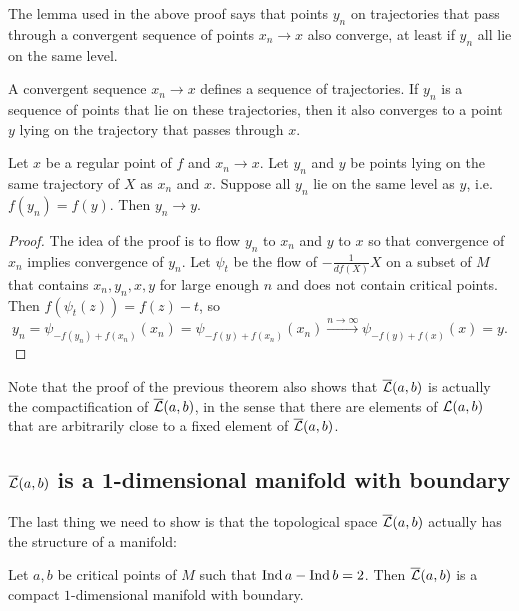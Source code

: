 The lemma used in the above proof says that points $y_n$ on trajectories that pass through a convergent sequence of points $x_n \to x$ also converge, at least if $y_n$ all lie on the same level.
\begin{marginfigure}
    \centering
    \caption{A convergent sequence $x_n \to  x$ defines a sequence of trajectories. If $y_n$ is a sequence of points that lie on these trajectories, then it also converges to a point $y$ lying on the trajectory that passes through $x$.}
    \label{fig:lemma-partial-squared-zero-proof}
\end{marginfigure}
\begin{lemma}
    Let $x$ be a regular point of $f$ and $x_n \to x$.
    Let $y_n$ and  $y$ be points lying on the same trajectory of $X$ as  $x_n$ and  $x$.
    Suppose all $y_n$ lie on the same level as  $y$, i.e.  $f(y_n) = f(y)$.
    Then  $y_n \to  y$.
    \label{lemma:level-sets}
\end{lemma}
\begin{proof}
    The idea of the proof is to flow $y_n$ to  $x_n$ and $y$ to $x$ so that convergence of $x_n$ implies convergence of $y_n$.
    Let  $\psi_t$ be the flow of  $-\frac{1}{df (X)} X$ on a subset of $M$ that contains $x_n, y_n, x, y$ for large enough  $n$ and does not contain critical points.
    Then $f(\psi_t(z)) = f(z) - t$, so
     \[
         y_n = \psi_{-f(y_n) + f(x_n)}(x_n) = \psi_{-f(y) + f(x_n)}(x_n) \xrightarrow{n \to \infty}   \psi_{-f(y) + f(x)}(x) = y
    .\] 
\end{proof}

Note that the proof of the previous theorem also shows that $\overline{\mathcal L}(a, b) $ is actually the compactification of  $\overline{\mathcal L}(a, b)$, in the sense that there are elements of  $\mathcal L(a, b)$ that are arbitrarily close to a fixed element of $\overline{\mathcal L}(a, b)$.

\subsection{$\overline{\mathcal L}(a, b)$ is a 1-dimensional manifold with boundary}

The last thing we need to show is that the topological space $\overline{\mathcal L}(a, b)$ actually has the structure of a manifold:

\begin{theorem}
    Let $a, b$ be critical points of  $M$ such that  $\operatorname{Ind} a - \operatorname{Ind} b = 2$. Then  $\overline{\mathcal L}(a, b)$ is a compact  $1$-dimensional manifold with boundary.
\end{theorem}

